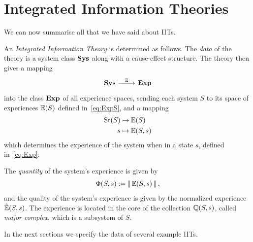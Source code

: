\section{Integrated Information Theories}\label{sec:IITs}

We can now summarise all that we have said about IITs.

\begin{definition}
An \emph{Integrated Information Theory} is determined as follows. The \emph{data} of the theory is a system class $\mathbf{Sys}$ along with a cause-effect structure. The theory then gives a mapping
\begin{equation} \label{eq:IIT-High-Level}
\begin{tikzcd}
\Sys\rar{\Exp} & \Expcat 
\end{tikzcd}
\end{equation}
into the class $\mathbf{Exp}$ of all experience spaces, sending each system $S$ to its space of experiences $\mathbb{E}(S)$ defined in~\eqref{eq:ExpS}, and a mapping
\begin{align}\begin{split} \label{eq:IIT-On-States}
\text{St}(S) &\to \mathbb{E}(S) \\ 
s &\mapsto \mathbb{E}(S,s) 
\end{split}\end{align}
which determines the experience of the system when in a state $s$, defined in~\eqref{eq:Exp}.

\noindent The \emph{quantity} of the system's experience is given by 
\begin{equation*}
\Phi(S,s) := \operatorname{| \hspace*{-0.1em}|} \mathbb{E}(S,s) \operatorname{| \hspace*{-0.1em}|} \:,
\end{equation*}
and the quality of the system's experience is given by the normalized experience $\hat {\mathbb{E}}(S,s)$.
The experience is located in the core of the collection $\mathbb{Q}(S,s)$, called \emph{major complex}, which is a subsystem of $S$.
\end{definition}


In the next sections we specify the data of several example IITs.


